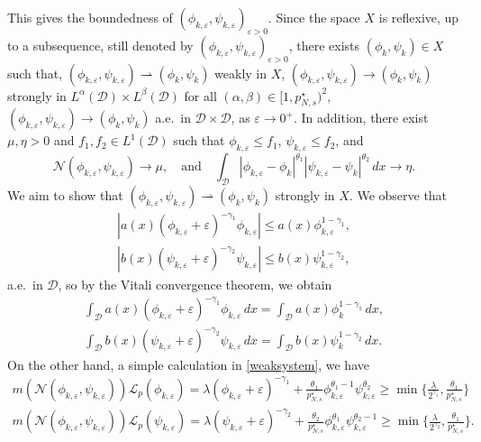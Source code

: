 \documentclass[reqno]{amsart}
\begin{document}
This gives the boundedness of 
$(\phi_{k,\varepsilon},\psi_{k,\varepsilon})_{\varepsilon>0}$. 
Since the space $X$ is reflexive, up to a subsequence, still denoted by 
$(\phi_{k,\varepsilon},\psi_{k,\varepsilon})_{\varepsilon>0}$, there exists 
$(\phi_k,\psi_k)\in X$ such that, 
$(\phi_{k,\varepsilon},\psi_{k,\varepsilon})\rightharpoonup (\phi_k,\psi_k)$ 
weakly in $X$, $(\phi_{k,\varepsilon},\psi_{k,\varepsilon})\to (\phi_k,\psi_k)$ 
strongly in 
$L^\alpha(\mathcal{D})\times L^\beta(\mathcal{D})$  for all $(\alpha,\beta)\in [1,p^\star_{N,s})^2$,
$(\phi_{k,\varepsilon},\psi_{k,\varepsilon})\to (\phi_k,\psi_k)$  a.e.\
in $\mathcal{D}\times \mathcal{D}$, as $\varepsilon\to 0^+$. In addition, there exist
$\mu,\eta>0$ and $f_1,f_2\in L^1(\mathcal{D})$ such that $\phi_{k,\varepsilon}\leq f_1$, 
$\psi_{k,\varepsilon}\leq f_2$, and
\begin{equation}\label{eq22}
\mathcal{N}(\phi_{k,\varepsilon},\psi_{k,\varepsilon})\to \mu,\quad \text{and}\quad
\int_\mathcal{D} |\phi_{k,\varepsilon}-\phi_k|^{\theta_1}|\psi_{k,\varepsilon}
-\psi_k|^{\theta_2}\,dx\to \eta.
\end{equation}
We aim to show that 
$(\phi_{k,\varepsilon},\psi_{k,\varepsilon})\rightharpoonup (\phi_k,\psi_k)$ 
strongly in $X$. We observe that
\begin{gather*}
|a(x) (\phi_{k,\varepsilon}+\varepsilon)^{-\gamma_1}\phi_{k,\varepsilon}|
\leq a(x)\phi_{k,\varepsilon}^{1-\gamma_1}, \\
|b(x) (\psi_{k,\varepsilon}+\varepsilon)^{-\gamma_2}\psi_{k,\varepsilon}|
\leq b(x)\psi_{k,\varepsilon}^{1-\gamma_2}, 
\end{gather*}
a.e.\ in $\mathcal{D}$, so by the Vitali convergence theorem, we obtain
\begin{gather}\label{eq33}
\int_\mathcal{D}a(x) (\phi_{k,\varepsilon}+\varepsilon)^{-\gamma_1}
\phi_{k,\varepsilon}\,dx=\int_\mathcal{D}a(x)\phi_k^{1-\gamma_1}\,dx,\\
\label{eq44}
\int_\mathcal{D}b(x) (\psi_{k,\varepsilon}+\varepsilon)^{-\gamma_2}
\psi_{k,\varepsilon}\,dx=\int_\mathcal{D}b(x)\psi_k^{1-\gamma_2}\,dx.
\end{gather}
On the other hand, a simple calculation in \eqref{weaksystem}, we have
\begin{gather*}
m(\mathcal{N}(\phi_{k,\varepsilon},\psi_{k,\varepsilon}))
\mathcal{L}_p(\phi_{k,\varepsilon})=\lambda(\phi_{k,\varepsilon}
 +\varepsilon)^{-\gamma_1}+\frac{\theta_1}{p^\star_{N,s}}\phi_{k,\varepsilon}^{\theta_1-1}\psi_{k,\varepsilon}^{\theta_2}\geq \min\lbrace \frac{\lambda}{2^{\gamma_1}} ,\frac{\theta_1}{p^\star_{N,s}}\rbrace  \\
m(\mathcal{N}(\phi_{k,\varepsilon},\psi_{k,\varepsilon}))\mathcal{L}_p
 (\psi_{k,\varepsilon})=\lambda(\psi_{k,\varepsilon}+\varepsilon)^{-\gamma_2}
 +\frac{\theta_2}{p^\star_{N,s}}\phi_{k,\varepsilon}^{\theta_1}
 \psi_{k,\varepsilon}^{\theta_2-1}\geq \min\lbrace  
 \frac{\lambda}{2^{\gamma_2}},\frac{\theta_1}{p^\star_{N,s}}\rbrace.
\end{gather*}
\end{document}
